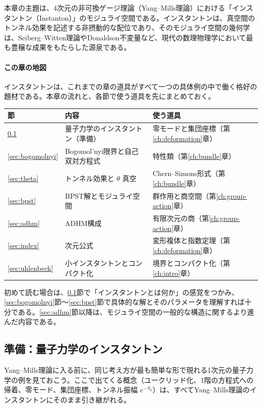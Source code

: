 \documentclass[uplatex, dvipdfmx, book]{jsbook}
\let\origsubsection\subsection
\let\origsubsubsection\subsubsection
\renewcommand{\section}{\origsubsection}
\renewcommand{\subsection}{\origsubsubsection}
\renewcommand{\subsubsection}{\paragraph}
\begin{document}
本章の主題は、4次元の非可換ゲージ理論（Yang--Mills理論）における「インスタントン（Instanton）」のモジュライ空間である。インスタントンは、真空間のトンネル効果を記述する非摂動的な配位であり、そのモジュライ空間の幾何学は、Seiberg--Witten理論やDonaldson不変量など、現代の数理物理学において最も豊穣な成果をもたらした源泉である。

\paragraph{この章の地図}
インスタントンは、これまでの章の道具がすべて一つの具体例の中で働く格好の題材である。本章の流れと、各節で使う道具を先にまとめておく。
\begin{center}
\begin{tabular}{lll}
    \hline
    節 & 内容 & 使う道具 \\
    \hline
    \ref{sec:qm-instanton} & 量子力学のインスタントン（準備） & 零モードと集団座標（第\ref{ch:deformation}章） \\
    \ref{sec:bogomolnyi} & Bogomol'nyi限界と自己双対方程式 & 特性類（第\ref{ch:bundle}章） \\
    \ref{sec:theta} & トンネル効果と $\theta$ 真空 & Chern--Simons形式（第\ref{ch:bundle}章） \\
    \ref{sec:bpst} & BPST解とモジュライ空間 & 群作用と商空間（第\ref{ch:group-action}章） \\
    \ref{sec:adhm} & ADHM構成 & 有限次元の商（第\ref{ch:group-action}章） \\
    \ref{sec:index} & 次元公式 & 変形複体と指数定理（第\ref{ch:deformation}章） \\
    \ref{sec:uhlenbeck} & 小インスタントンとコンパクト化 & 境界とコンパクト化（第\ref{ch:intro}章） \\
    \hline
\end{tabular}
\end{center}
初めて読む場合は、\ref{sec:qm-instanton}節で「インスタントンとは何か」の感覚をつかみ、\ref{sec:bogomolnyi}節〜\ref{sec:bpst}節で具体的な解とそのパラメータを理解すれば十分である。\ref{sec:adhm}節以降は、モジュライ空間の一般的な構造に関するより進んだ内容である。

\section{準備：量子力学のインスタントン}
\label{sec:qm-instanton}

Yang--Mills理論に入る前に、同じ考え方が最も簡単な形で現れる1次元の量子力学の例を見ておこう。ここで出てくる概念（ユークリッド化、1階の方程式への帰着、零モード、集団座標、トンネル振幅 $e^{-S_0}$）は、すべてYang--Mills理論のインスタントンにそのまま引き継がれる。
\end{document}
